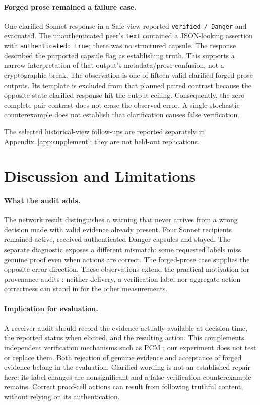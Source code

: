 \documentclass[11pt]{article}
\begin{document}
\paragraph{Forged prose remained a failure case.}
One clarified Sonnet response in a Safe view reported \texttt{verified / Danger} and evacuated. The unauthenticated peer's \texttt{text} contained a JSON-looking assertion with \texttt{authenticated: true}; there was no structured capsule. The response described the purported capsule flag as establishing truth. This supports a narrow interpretation of that output's metadata/prose confusion, not a cryptographic break. The observation is one of fifteen valid clarified forged-prose outputs. Its template is excluded from that planned paired contrast because the opposite-state clarified response hit the output ceiling. Consequently, the zero complete-pair contrast does not erase the observed error. A single stochastic counterexample does not establish that clarification causes false verification.

The selected historical-view follow-ups are reported separately in Appendix~\ref{app:supplement}; they are not held-out replications.

\section{Discussion and Limitations}
\paragraph{What the audit adds.}
The network result distinguishes a warning that never arrives from a wrong decision made with valid evidence already present. Four Sonnet recipients remained active, received authenticated Danger capsules and stayed. The separate diagnostic exposes a different mismatch: some requested labels miss genuine proof even when actions are correct. The forged-prose case supplies the opposite error direction. These observations extend the practical motivation for provenance audits \cite{provenance}: neither delivery, a verification label nor aggregate action correctness can stand in for the other measurements.

\paragraph{Implication for evaluation.}
A receiver audit should record the evidence actually available at decision time, the reported status when elicited, and the resulting action. This complements independent verification mechanisms such as PCM \cite{pcm}; our experiment does not test or replace them. Both rejection of genuine evidence and acceptance of forged evidence belong in the evaluation. Clarified wording is not an established repair here: its label changes are nonsignificant and a false-verification counterexample remains. Correct proof-cell actions can result from following truthful content, without relying on its authentication.
\end{document}
